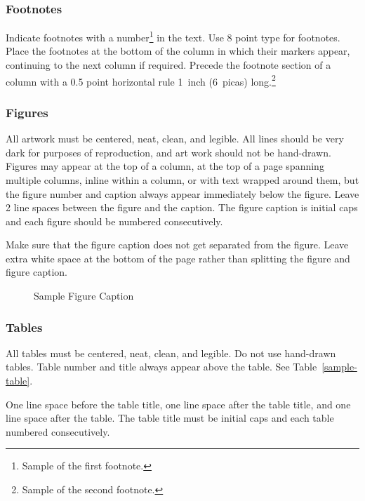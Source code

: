 \documentclass[twoside]{article}
\begin{document}
\subsubsection{Footnotes}

Indicate footnotes with a number\footnote{Sample of the first
  footnote.} in the text. Use 8 point type for footnotes. Place the
footnotes at the bottom of the column in which their markers appear,
continuing to the next column if required. Precede the footnote
section of a column with a 0.5 point horizontal rule 1~inch (6~picas)
long.\footnote{Sample of the second footnote.}

\subsubsection{Figures}

All artwork must be centered, neat, clean, and legible.  All lines
should be very dark for purposes of reproduction, and art work should
not be hand-drawn.  Figures may appear at the top of a column, at the
top of a page spanning multiple columns, inline within a column, or
with text wrapped around them, but the figure number and caption
always appear immediately below the figure.  Leave 2 line spaces
between the figure and the caption. The figure caption is initial caps
and each figure should be numbered consecutively.

Make sure that the figure caption does not get separated from the
figure. Leave extra white space at the bottom of the page rather than
splitting the figure and figure caption.
\begin{figure}[h]
\vspace{.3in}
\centerline{}
\vspace{.3in}
\caption{Sample Figure Caption}
\end{figure}

\subsubsection{Tables}

All tables must be centered, neat, clean, and legible. Do not use hand-drawn tables. Table number and title always appear above the table.
See Table~\ref{sample-table}.

One line space before the table title, one line space after the table title, and one line space after the table. The table title must be
initial caps and each table numbered consecutively.
\end{document}
